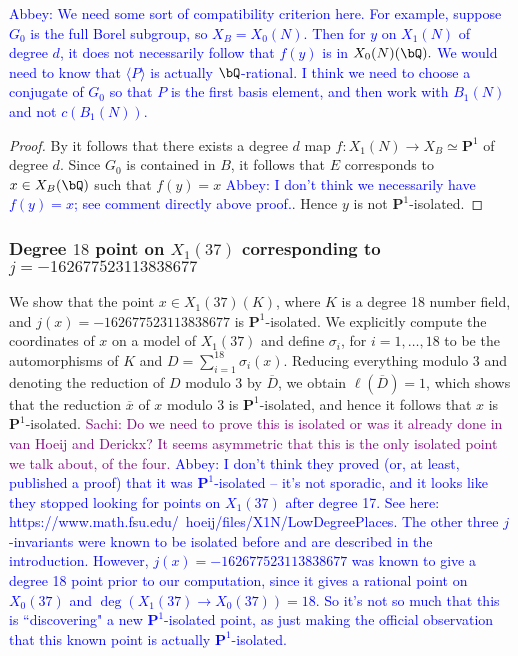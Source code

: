 \documentclass[11pt,reqno]{amsart}
\theoremstyle{plain}
\theoremstyle{definition}
\newcommand{\Q}{\bQ}
\newcommand{\PP}{\mathbf P}
\newcommand{\filip}[1]{{\textcolor{cyan}{Filip: [#1]}}}
\newcommand{\abbey}[1]{\textcolor{blue}{Abbey: #1}}
\newcommand{\sachi}[1]{\textcolor{purple}{Sachi: #1}}
\begin{document}
\abbey{We need some sort of compatibility criterion here. For example, suppose $G_0$ is the full Borel subgroup, so $X_B=X_0(N)$. Then for $y$ on $X_1(N)$ of degree $d$, it does not necessarily follow that $f(y)$ is in $X_0(N)(\Q).$ We would need to know that $\langle P \rangle$ is actually $\Q$-rational. I think we need to choose a conjugate of $G_0$ so that $P$ is the first basis element, and then work with $B_1(N)$ and not $c(B_1(N))$.}

\begin{proof}
    By  it follows that there exists a degree $d$ map $f\colon X_1(N)\rightarrow X_B\simeq \PP^1$ of degree $d$. Since $G_0$ is contained in $B$, it follows that $E$ corresponds to  $x\in X_B(\Q)$ such that $f(y)=x$ \abbey{I don't think we necessarily have $f(y)=x$; see comment directly above proof.}. Hence $y$ is not $\PP^1$-isolated.
\end{proof}

\fi


\subsubsection{Degree $18$ point on $X_1(37)$ corresponding to $j=-162677523113838677$}

We show that the point $x\in X_1(37)(K)$, where $K$ is a degree 18 number field, and $j(x)=-162677523113838677$ is $\PP^1$-isolated. We explicitly compute the coordinates of $x$ on a model of $X_1(37)$ and define  $\sigma_i$, for $i=1,\ldots, 18$ to be the automorphisms of $K$ and $D=\sum_{i=1}^{18}\sigma_i(x)$. Reducing everything modulo $3$ and denoting the reduction of $D$ modulo $3$ by $\overline{D}$, we obtain $\ell(\overline{D})=1$, which shows that the reduction
$\overline{x}$ of $x$ modulo 3 is $\PP^1$-isolated, and hence it follows that $x$ is $\PP^1$-isolated.  %
\sachi{Do we need to prove this is isolated or was it already done in van Hoeij and Derickx? It seems asymmetric that this is the only isolated point we talk about, of the four.} \abbey{I don't think they proved (or, at least, published a proof) that it was $\PP^1$-isolated -- it's not sporadic, and it looks like they stopped looking for points on $X_1(37)$ after degree 17. See here: https://www.math.fsu.edu/~hoeij/files/X1N/LowDegreePlaces. The other three $j$-invariants were known to be isolated before and are described in the introduction. However, $j(x)=-162677523113838677$ was known to give a degree 18 point prior to our computation, since it gives a rational point on $X_0(37)$ and $\deg(X_1(37) \rightarrow X_0(37))=18$. So it's not so much that this is ``discovering" a new $\PP^1$-isolated point, as just making the official observation that this known point is actually $\PP^1$-isolated.}
\end{document}
